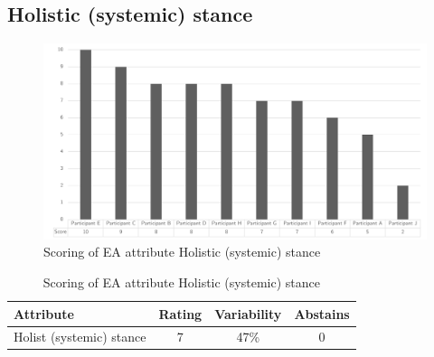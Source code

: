 \subsection{Holistic (systemic) stance}
\begin{figure}[H]
	\centering
	\includegraphics[width=0.9\linewidth]{images/scoreeaholisticsystemsstance}
	\caption[Scoring of EA attribute Holistic (systemic) stance]{Scoring of EA attribute Holistic (systemic) stance}
	\label{fig:appscoringeaholisticsystemsstance}
\end{figure}
\begin{table}[H]
	\centering
	\begin{tabular}{p{}ccc}
		\toprule
		\textbf{Attribute} & \textbf{Rating} & \textbf{Variability} & \textbf{Abstains} \\
		\midrule
		Holist (systemic) stance & 7 & 47\% & 0 \\%
		\bottomrule
	\end{tabular}%
	\caption[Scoring of EA attribute Holistic (systemic) stance]{Scoring of EA attribute Holistic (systemic) stance}
	\label{tab:appscoringeaholisticsystemsstance}%
\end{table}%
\newpage
